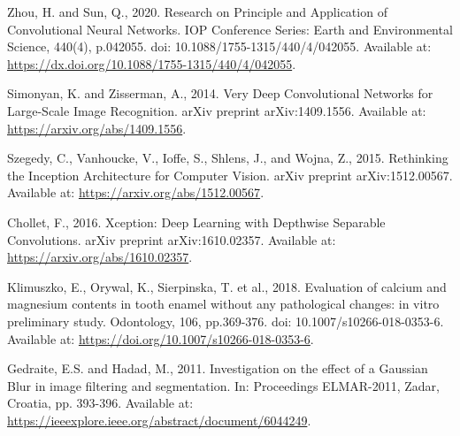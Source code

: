 \begin{thebibliography}{99}
    Zhou, H. and Sun, Q., 2020. Research on Principle and Application of Convolutional Neural Networks. IOP Conference Series: Earth and Environmental Science, 440(4), p.042055. doi: 10.1088/1755-1315/440/4/042055. Available at: \url{https://dx.doi.org/10.1088/1755-1315/440/4/042055}.

    Simonyan, K. and Zisserman, A., 2014. Very Deep Convolutional Networks for Large-Scale Image Recognition. arXiv preprint arXiv:1409.1556. Available at: \url{https://arxiv.org/abs/1409.1556}.
    
    Szegedy, C., Vanhoucke, V., Ioffe, S., Shlens, J., and Wojna, Z., 2015. Rethinking the Inception Architecture for Computer Vision. arXiv preprint arXiv:1512.00567. Available at: \url{https://arxiv.org/abs/1512.00567}.
    
    Chollet, F., 2016. Xception: Deep Learning with Depthwise Separable Convolutions. arXiv preprint arXiv:1610.02357. Available at: \url{https://arxiv.org/abs/1610.02357}.

    Klimuszko, E., Orywal, K., Sierpinska, T. et al., 2018. Evaluation of calcium and magnesium contents in tooth enamel without any pathological changes: in vitro preliminary study. Odontology, 106, pp.369-376. doi: 10.1007/s10266-018-0353-6. Available at: \url{https://doi.org/10.1007/s10266-018-0353-6}.

    Gedraite, E.S. and Hadad, M., 2011. Investigation on the effect of a Gaussian Blur in image filtering and segmentation. In: Proceedings ELMAR-2011, Zadar, Croatia, pp. 393-396. Available at: \url{https://ieeexplore.ieee.org/abstract/document/6044249}.
\end{thebibliography}